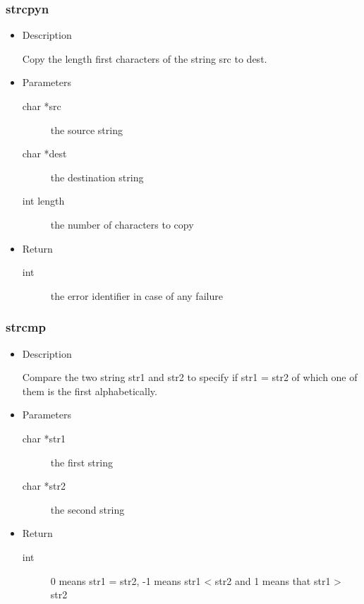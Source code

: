 \subsubsection{strcpyn}
\begin{itemize}
\item{Description}

	Copy the length first characters of the string src to dest.
\item{Parameters}
	\begin{description}
	\item[char *src] the source string
	\item[char *dest] the destination string
	\item[int length] the number of characters to copy
	\end{description}
\item{Return}
	\begin{description}
	\item[int] the error identifier in case of any failure
	\end{description}
\end{itemize}

\subsubsection{strcmp}
\begin{itemize}
\item{Description}

	Compare the two string str1 and str2 to specify if str1 = str2
	of which one of them is the first alphabetically.
\item{Parameters}
	\begin{description}
	\item[char *str1] the first string
	\item[char *str2] the second string
	\end{description}
\item{Return}
	\begin{description}
	\item[int] 0 means str1 = str2, -1 means str1 < str2 and 1 means
		that str1 > str2
	\end{description}
\end{itemize}

